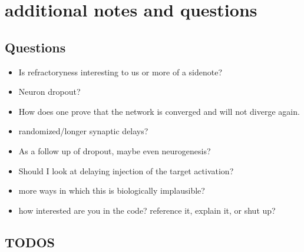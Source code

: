 \chapter{additional notes and questions}

\section{Questions}


\begin{itemize}
    \item Is refractoryness interesting to us or more of a sidenote?
    \item Neuron dropout?
    \item How does one prove that the network is converged and will not diverge again.
    \item randomized/longer synaptic delays?
    \item As a follow up of dropout, maybe even neurogenesis?
    \item Should I look at delaying injection of the target activation?
    \item more ways in which this is biologically implausible?
    \item how interested are you in the code? reference it, explain it, or shut up?
\end{itemize}


\section{TODOS}

